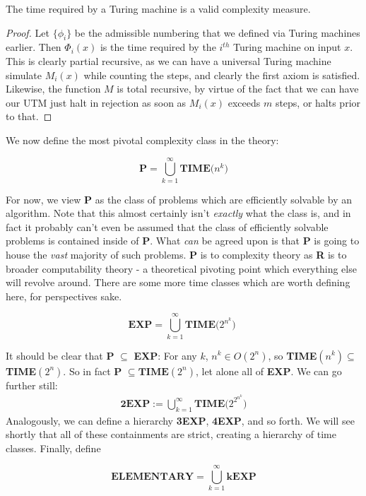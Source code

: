 \begin{fact}
    The time required by a Turing machine is a valid complexity measure.
\end{fact}
\begin{proof}
    Let $\{\phi_i\}$ be the admissible numbering that we defined via Turing machines earlier. Then $\Phi_i(x)$ is the time required by the $i^{th}$ Turing machine on input $x$. This is clearly partial recursive, as we can have a universal Turing machine simulate $M_i(x)$ while counting the steps, and clearly the first axiom is satisfied. Likewise, the function $M$ is total recursive, by virtue of the fact that we can have our UTM just halt in rejection as soon as $M_i(x)$ exceeds $m$ steps, or halts prior to that.
\end{proof}
We now define the most pivotal complexity class in the theory:
\begin{definition}
\[ \textbf{P} = \bigcup_{k=1}^\infty \textbf{TIME($n^k$)} \]
\end{definition}
For now, we view \textbf{P} as the class of problems which are efficiently solvable by an algorithm. Note that this almost certainly isn't \textit{exactly} what the class is, and in fact it probably can't even be assumed that the class of efficiently solvable problems is contained inside of \textbf{P}. What \textit{can} be agreed upon is that \textbf{P} is going to house the \textit{vast} majority of such problems. \textbf{P} is to complexity theory as \textbf{R} is to broader computability theory - a theoretical pivoting point which everything else will revolve around. There are some more time classes which are worth defining here, for perspectives sake. 
\begin{definition}
\[ \textbf{EXP} =  \bigcup_{k=1}^\infty \textbf{TIME($2^{n^k}$) } \]
\end{definition}
It should be clear that \textbf{P} $\subseteq$ \textbf{EXP}: For any $k$, $n^k \in O(2^n)$, so \textbf{TIME}$(n^k) \subseteq $\textbf{TIME}$(2^n)$. So in fact \textbf{P} $\subseteq \textbf{TIME}(2^n)$, let alone all of \textbf{EXP}. 
We can go further still:
\begin{align}
    \textbf{2EXP} := \bigcup_{k=1}^{\infty} \textbf{TIME($2^{2^{n^k}}$)}
\end{align}
Analogously, we can define a hierarchy \textbf{3EXP}, \textbf{4EXP}, and so forth. We will see shortly that all of these containments are strict, creating a hierarchy of time classes. Finally, define
\begin{definition}
    \[ \textbf{ELEMENTARY} = \bigcup_{k=1}^{\infty}\textbf{kEXP} \]
\end{definition}
